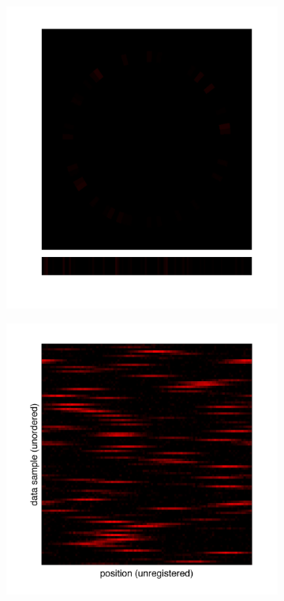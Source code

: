 \documentclass{pnastwo}
\begin{document}
\begin{figure}
\begin{subfigure}{0.17\textwidth}
\includegraphics[width=\textwidth]{illustrate_toy}
\caption{}
\label{subfig:1d_image_example}
\end{subfigure}
\begin{subfigure}{0.2\textwidth}
\includegraphics[width=\textwidth]{unregistered_unordered_toy}

\end{subfigure}
\end{figure}
\end{document}

